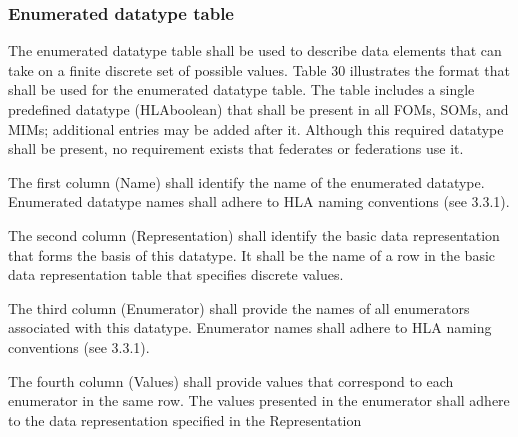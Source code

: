 \subsubsection{Enumerated datatype table}
The enumerated datatype table shall be used to describe data elements that can take on a finite discrete set of possible values. Table 30 illustrates the format that shall be used for the enumerated datatype table. The table includes a single predefined datatype (HLAboolean) that shall be present in all FOMs, SOMs, and MIMs; additional entries may be added after it. Although this required datatype shall be present, no requirement exists that federates or federations use it.

The first column (Name) shall identify the name of the enumerated datatype. Enumerated datatype names shall adhere to HLA naming conventions (see 3.3.1).

The second column (Representation) shall identify the basic data representation that forms the basis of this datatype. It shall be the name of a row in the basic data representation table that specifies discrete values.

The third column (Enumerator) shall provide the names of all enumerators associated with this datatype. Enumerator names shall adhere to HLA naming conventions (see 3.3.1).

The fourth column (Values) shall provide values that correspond to each enumerator in the same row. The values presented in the enumerator shall adhere to the data representation specified in the Representation

